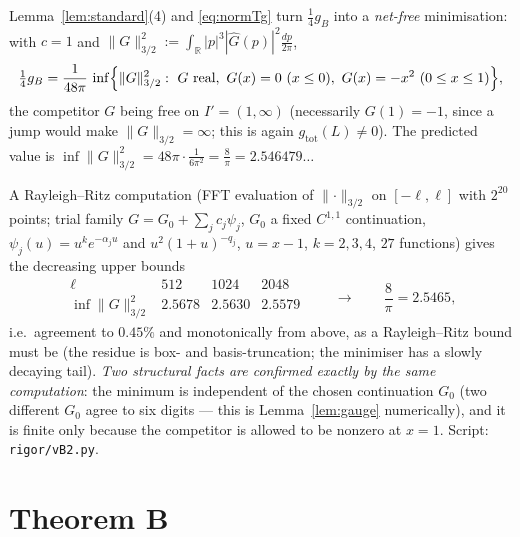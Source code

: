 \documentclass[11pt]{article}
\newcommand{\norm}[1]{\lVert#1\rVert}
\newcommand{\gB}{g_B}
\newcommand{\gtot}{g_{\mathrm{tot}}}
\begin{document}
Lemma~\ref{lem:standard}(4) and \eqref{eq:normTg} turn $\frac14\gB$ into a \emph{net-free} minimisation:
with $c=1$ and $\norm G_{3/2}^2:=\int_{\mathbb R}|p|^3|\widehat G(p)|^2\frac{dp}{2\pi}$,
\begin{equation}\label{eq:varnum}
 \tfrac14\gB=\frac1{48\pi}\,\inf\Bigl\{\norm G_{3/2}^2:\ G\ \text{real},\
 G(x)=0\ (x\le0),\ G(x)=-x^2\ (0\le x\le1)\Bigr\},
\end{equation}
the competitor $G$ being free on $I'=(1,\infty)$ (necessarily $G(1)=-1$, since a jump would make
$\norm G_{3/2}=\infty$; this is again $\gtot(L)\ne0$).  The predicted value is
$\inf\norm G_{3/2}^2=48\pi\cdot\frac1{6\pi^2}=\frac8\pi=2.546479\ldots$

A Rayleigh--Ritz computation (FFT evaluation of $\norm\cdot_{3/2}$ on $[-\ell,\ell]$ with $2^{20}$ points;
trial family $G=G_0+\sum_jc_j\psi_j$, $G_0$ a fixed $C^{1,1}$ continuation, $\psi_j(u)=u^ke^{-\alpha_ju}$
and $u^2(1+u)^{-q_j}$, $u=x-1$, $k=2,3,4$, $27$ functions) gives the decreasing upper bounds
\[
 \begin{array}{c|ccc}
 \ell & 512 & 1024 & 2048\\\hline
 \inf\norm G_{3/2}^2 & 2.5678 & 2.5630 & 2.5579
 \end{array}
 \qquad\longrightarrow\qquad \frac8\pi=2.5465 ,
\]
i.e.\ agreement to $0.45\%$ and monotonically from above, as a Rayleigh--Ritz bound must be (the residue is
box- and basis-truncation; the minimiser has a slowly decaying tail).  \emph{Two structural facts are
confirmed exactly by the same computation}: the minimum is independent of the chosen continuation $G_0$
(two different $G_0$ agree to six digits --- this is Lemma~\ref{lem:gauge} numerically), and it is finite
only because the competitor is allowed to be nonzero at $x=1$.
Script: \texttt{rigor/vB2.py}.

\section{Theorem B}\label{sec:thmB}
\end{document}
